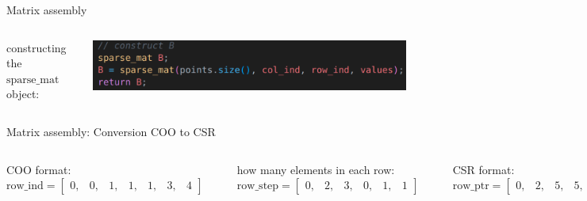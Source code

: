 \documentclass[aspectratio=169,xcolor=dvipsnames]{beamer}
\begin{document}
\begin{frame}{Matrix assembly}
\begin{columns}[c]
constructing the $\mathrm{sparse\_mat}$ object: \\
\begin{center}
    \includegraphics[width=0.9\linewidth]{sparse_create.png}
    \end{center}
    \end{columns}


\end{frame}

\begin{frame}{Matrix assembly: Conversion COO to CSR}
    \begin{columns}[c] %

COO format: \\
$\mathrm{row\_ind} = \begin{bmatrix}
		0, & 0, & 1, & 1, & 1, & 3, & 4 
		\end{bmatrix}$

\begin{center}
    \includegraphics[width=0.7\linewidth]{conversion1.png}
    \end{center}

how many elements in each row:
$\mathrm{row\_step} = \begin{bmatrix}
		0, & 2, & 3, & 0, & 1, & 1 
		\end{bmatrix}$

\begin{center}
    \includegraphics[width=0.7\linewidth]{conversion2.png}
    \end{center}

CSR format: \\
$\mathrm{row\_ptr} = \begin{bmatrix}
		0, & 2, & 5, & 5, & 6, & 7 
		\end{bmatrix}$


\end{columns}
\end{frame}
\end{document}
